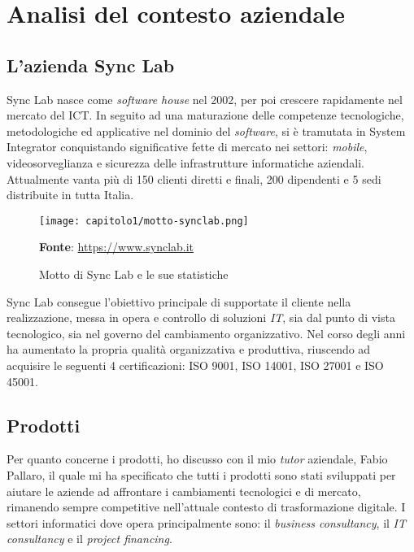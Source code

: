 
\chapter{Analisi del contesto aziendale}
\label{cap:contesto-aziendale}

\section{L'azienda Sync Lab}
Sync Lab nasce come \textit{software house} nel 2002, per poi crescere rapidamente nel mercato del \gls{ICT}. In seguito ad una maturazione delle competenze tecnologiche, metodologiche ed applicative nel dominio del \textit{software}, si è tramutata in \gls{System Integrator} conquistando significative fette di mercato nei settori: \textit{mobile}, videosorveglianza e sicurezza delle infrastrutture informatiche aziendali. Attualmente vanta più di 150 clienti diretti e finali, 200 dipendenti e 5 sedi distribuite in tutta Italia. 

\begin{figure}[!h]
  \centering
  \texttt{[image: capitolo1/motto-synclab.png]}
  \caption{Motto di Sync Lab e le sue statistiche}
  \textbf{Fonte}: \href{https://www.synclab.it}{https://www.synclab.it}
\end{figure}

Sync Lab consegue l'obiettivo principale di supportate il cliente nella realizzazione, messa in opera e controllo di soluzioni \textit{IT}, sia dal punto di vista tecnologico, sia nel governo del cambiamento organizzativo. Nel corso degli anni ha aumentato la propria qualità organizzativa e produttiva, riuscendo ad acquisire le seguenti 4 certificazioni: ISO 9001, ISO 14001, ISO 27001 e ISO 45001.

\section{Prodotti}
Per quanto concerne i prodotti, ho discusso con il mio \textit{tutor} aziendale, Fabio Pallaro, il quale mi ha specificato che tutti i prodotti sono stati sviluppati per aiutare le aziende ad affrontare i cambiamenti tecnologici e di mercato, rimanendo sempre competitive nell'attuale contesto di trasformazione digitale. I settori informatici dove opera principalmente sono: il \textit{business consultancy}, il \textit{IT consultancy} e il \textit{project financing}.

